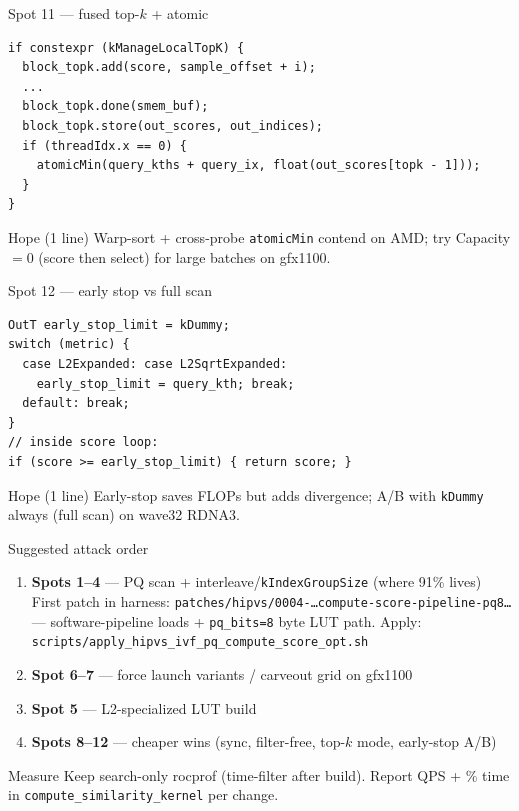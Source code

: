 \documentclass[aspectratio=169,10pt]{beamer}
\begin{document}
\begin{frame}[fragile]{Spot 11 --- fused top-$k$ + atomic}
\begin{lstlisting}
if constexpr (kManageLocalTopK) {
  block_topk.add(score, sample_offset + i);
  ...
  block_topk.done(smem_buf);
  block_topk.store(out_scores, out_indices);
  if (threadIdx.x == 0) {
    atomicMin(query_kths + query_ix, float(out_scores[topk - 1]));
  }
}
\end{lstlisting}
  \vspace{0.3em}
  \begin{alertblock}{Hope (1 line)}
    Warp-sort + cross-probe \texttt{atomicMin} contend on AMD; try
    Capacity$=0$ (score then select) for large batches on gfx1100.
  \end{alertblock}
\end{frame}

\begin{frame}[fragile]{Spot 12 --- early stop vs full scan}
\begin{lstlisting}
OutT early_stop_limit = kDummy;
switch (metric) {
  case L2Expanded: case L2SqrtExpanded:
    early_stop_limit = query_kth; break;
  default: break;
}
// inside score loop:
if (score >= early_stop_limit) { return score; }
\end{lstlisting}
  \vspace{0.3em}
  \begin{alertblock}{Hope (1 line)}
    Early-stop saves FLOPs but adds divergence; A/B with
    \texttt{kDummy} always (full scan) on wave32 RDNA3.
  \end{alertblock}
\end{frame}

\begin{frame}{Suggested attack order}
  \footnotesize
  \begin{enumerate}
    \item \textbf{Spots 1--4} --- PQ scan + interleave/\texttt{kIndexGroupSize}
          (where 91\% lives)\\
          {\scriptsize First patch in harness:
          \texttt{patches/hipvs/0004-\ldots compute-score-pipeline-pq8\ldots}
          --- software-pipeline loads + \texttt{pq\_bits=8} byte LUT path.
          Apply: \texttt{scripts/apply\_hipvs\_ivf\_pq\_compute\_score\_opt.sh}}
    \item \textbf{Spot 6--7} --- force launch variants / carveout grid on gfx1100
    \item \textbf{Spot 5} --- L2-specialized LUT build
    \item \textbf{Spots 8--12} --- cheaper wins (sync, filter-free, top-$k$ mode,
          early-stop A/B)
  \end{enumerate}
  \vspace{0.5em}
  \begin{block}{Measure}
    Keep search-only rocprof (time-filter after build). Report QPS +
    \% time in \texttt{compute\_similarity\_kernel} per change.
  \end{block}
\end{frame}
\end{document}
